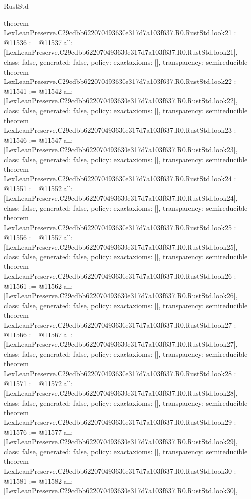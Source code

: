 \begin{lexlean}{RustStd}
\begin{coremodule}
{}
theorem LexLeanPreserve.C29cdbb622070493630e317d7a103f637.R0.RustStd.look21 : @11536 := @11537 {
  all: [LexLeanPreserve.C29cdbb622070493630e317d7a103f637.R0.RustStd.look21],
  class: false,
  generated: false,
  policy: exact{axioms: []},
  transparency: semireducible
}
theorem LexLeanPreserve.C29cdbb622070493630e317d7a103f637.R0.RustStd.look22 : @11541 := @11542 {
  all: [LexLeanPreserve.C29cdbb622070493630e317d7a103f637.R0.RustStd.look22],
  class: false,
  generated: false,
  policy: exact{axioms: []},
  transparency: semireducible
}
theorem LexLeanPreserve.C29cdbb622070493630e317d7a103f637.R0.RustStd.look23 : @11546 := @11547 {
  all: [LexLeanPreserve.C29cdbb622070493630e317d7a103f637.R0.RustStd.look23],
  class: false,
  generated: false,
  policy: exact{axioms: []},
  transparency: semireducible
}
theorem LexLeanPreserve.C29cdbb622070493630e317d7a103f637.R0.RustStd.look24 : @11551 := @11552 {
  all: [LexLeanPreserve.C29cdbb622070493630e317d7a103f637.R0.RustStd.look24],
  class: false,
  generated: false,
  policy: exact{axioms: []},
  transparency: semireducible
}
theorem LexLeanPreserve.C29cdbb622070493630e317d7a103f637.R0.RustStd.look25 : @11556 := @11557 {
  all: [LexLeanPreserve.C29cdbb622070493630e317d7a103f637.R0.RustStd.look25],
  class: false,
  generated: false,
  policy: exact{axioms: []},
  transparency: semireducible
}
theorem LexLeanPreserve.C29cdbb622070493630e317d7a103f637.R0.RustStd.look26 : @11561 := @11562 {
  all: [LexLeanPreserve.C29cdbb622070493630e317d7a103f637.R0.RustStd.look26],
  class: false,
  generated: false,
  policy: exact{axioms: []},
  transparency: semireducible
}
theorem LexLeanPreserve.C29cdbb622070493630e317d7a103f637.R0.RustStd.look27 : @11566 := @11567 {
  all: [LexLeanPreserve.C29cdbb622070493630e317d7a103f637.R0.RustStd.look27],
  class: false,
  generated: false,
  policy: exact{axioms: []},
  transparency: semireducible
}
theorem LexLeanPreserve.C29cdbb622070493630e317d7a103f637.R0.RustStd.look28 : @11571 := @11572 {
  all: [LexLeanPreserve.C29cdbb622070493630e317d7a103f637.R0.RustStd.look28],
  class: false,
  generated: false,
  policy: exact{axioms: []},
  transparency: semireducible
}
theorem LexLeanPreserve.C29cdbb622070493630e317d7a103f637.R0.RustStd.look29 : @11576 := @11577 {
  all: [LexLeanPreserve.C29cdbb622070493630e317d7a103f637.R0.RustStd.look29],
  class: false,
  generated: false,
  policy: exact{axioms: []},
  transparency: semireducible
}
theorem LexLeanPreserve.C29cdbb622070493630e317d7a103f637.R0.RustStd.look30 : @11581 := @11582 {
  all: [LexLeanPreserve.C29cdbb622070493630e317d7a103f637.R0.RustStd.look30],
}
\end{coremodule}
\end{lexlean}
